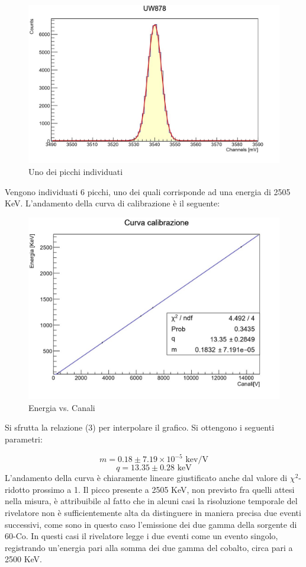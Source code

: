 \documentclass[a4paper,10pt]{article}
\newcommand*{\unit}[1]{\ensuremath{\mathrm{\,#1}}}
\begin{document}
\begin{figure}[H]
    \centering
    \includegraphics[scale=0.6]{grafici/piccouw878}
    \caption{Uno dei picchi individuati}
\end{figure}

\noindent Vengono individuati 6 picchi, uno dei quali corrisponde ad una energia di 2505 KeV. L'andamento della curva di calibrazione \`e il seguente:

\begin{figure}[H]
    \centering
    \includegraphics[scale=0.45]{grafici/rettacalibrazionemultigamma}
    \caption{Energia vs. Canali}
\end{figure}

\noindent Si sfrutta la relazione (3) per interpolare il grafico. Si ottengono i seguenti parametri:

$$
	m=0.18 \pm 7.19 \times 10^{-5}\, \unit{kev/V}
$$
$$
	q=13.35 \pm 0.28\, \unit{keV}
$$
L'andamento della curva \`e chiaramente lineare giustificato anche dal valore di $\chi^2$-ridotto prossimo a 1. Il picco presente a 2505 KeV, non previsto fra quelli attesi nella misura, \`e attribuibile al fatto che in alcuni casi la risoluzione temporale del rivelatore non \`e sufficientemente alta da distinguere in maniera precisa due eventi successivi, come sono in questo caso l'emissione dei due gamma della sorgente di 60-Co. In questi casi il rivelatore legge i due eventi come un evento singolo, registrando un'energia pari alla somma dei due gamma del cobalto, circa pari a 2500 KeV.
\end{document}
